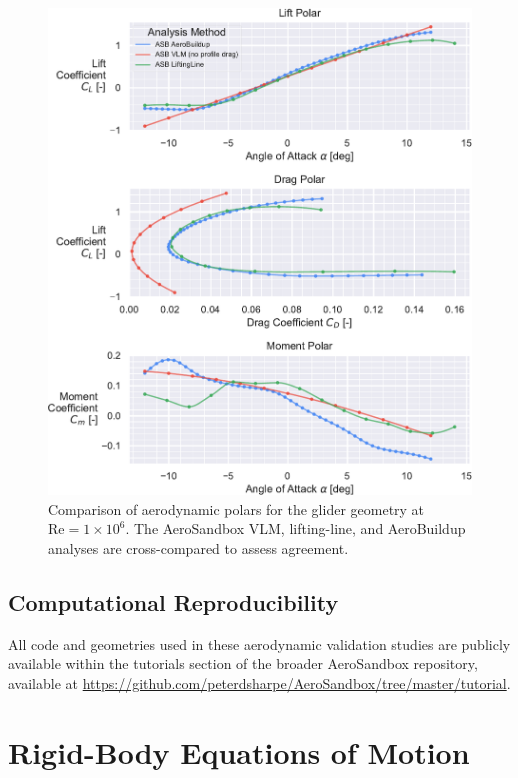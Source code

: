 \begin{figure}[!htb]
    \centering
    \includegraphics[width=\textwidth]{../figures/aero_validation/glider_polars-crop.pdf}
    \caption{Comparison of aerodynamic polars for the glider geometry at $\text{Re}=1 \times 10^6$. The AeroSandbox VLM, lifting-line, and AeroBuildup analyses are cross-compared to assess agreement.}
    \label{fig:glider_results}
\end{figure}


\subsection{Computational Reproducibility}

All code and geometries used in these aerodynamic validation studies are publicly available within the tutorials section of the broader AeroSandbox repository, available at \url{https://github.com/peterdsharpe/AeroSandbox/tree/master/tutorial}.


\section{Rigid-Body Equations of Motion}

%

